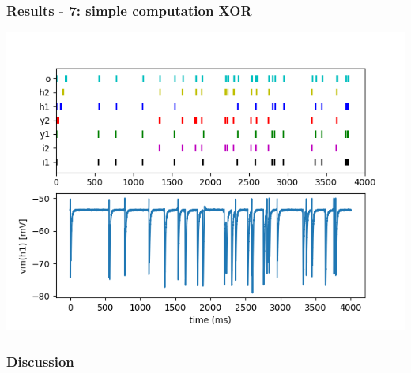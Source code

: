 \documentclass{beamer}
\begin{document}
\begin{frame}
    \frametitle{Results - 7: simple computation XOR}
    \includegraphics[width=\textwidth]{figures/XOR-output.png}
\end{frame}

\begin{frame}
    \frametitle{Discussion}
\end{frame}
\end{document}
